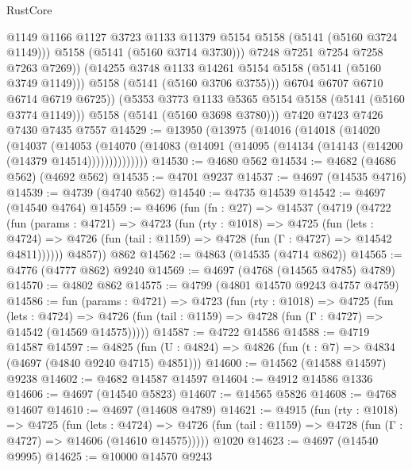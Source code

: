 \begin{lexlean}{RustCore}
\begin{coremodule}
                    @1149
                    @1166
                    @1127
                    @3723
                    @1133
                    @11379
                    @5154
                    @5158
                    (@5141 (@5160 @3724 @1149)))
                  @5158
                  (@5141 (@5160 @3714 @3730)))
                @7248
                @7251
                @7254
                @7258
                @7263
                @7269))
            (@14255 @3748 @1133 @14261 @5154 @5158 (@5141 (@5160 @3749 @1149)))
            @5158
            (@5141 (@5160 @3706 @3755)))
          @6704
          @6707
          @6710
          @6714
          @6719
          @6725))
      (@5353 @3773 @1133 @5365 @5154 @5158 (@5141 (@5160 @3774 @1149)))
      @5158
      (@5141 (@5160 @3698 @3780)))
    @7420
    @7423
    @7426
    @7430
    @7435
    @7557
@14529 := @13950
    (@13975
      (@14016
        (@14018
          (@14020
            (@14037
              (@14053
                (@14070 (@14083 (@14091 (@14095 (@14134 (@14143 (@14200 (@14379 @14514))))))))))))))
@14530 := @4680 @562
@14534 := @4682 (@4686 @562) (@4692 @562)
@14535 := @4701 @9237
@14537 := @4697 (@14535 @4716)
@14539 := @4739 (@4740 @562)
@14540 := @4735 @14539
@14542 := @4697 (@14540 @4764)
@14559 := @4696
    (fun (fn : @27) =>
    @14537
      (@4719
        (@4722
          (fun (params : @4721) =>
          @4723
            (fun (rty : @1018) =>
            @4725
              (fun (lets : @4724) =>
              @4726 (fun (tail : @1159) => @4728 (fun (Γ : @4727) => @14542 @4811))))))
        @4857))
    @862
@14562 := @4863 (@14535 (@4714 @862))
@14565 := @4776 (@4777 @862) @9240
@14569 := @4697 (@4768 (@14565 @4785) @4789)
@14570 := @4802 @862
@14575 := @4799 (@4801 @14570 @9243 @4757 @4759)
@14586 := fun (params : @4721) =>
  @4723
    (fun (rty : @1018) =>
    @4725
      (fun (lets : @4724) =>
      @4726 (fun (tail : @1159) => @4728 (fun (Γ : @4727) => @14542 (@14569 @14575)))))
@14587 := @4722 @14586
@14588 := @4719 @14587
@14597 := @4825 (fun (U : @4824) => @4826 (fun (t : @7) => @4834 (@4697 (@4840 @9240 @4715) @4851)))
@14600 := @14562 (@14588 @14597) @9238
@14602 := @4682 @14587 @14597
@14604 := @4912 @14586 @1336
@14606 := @4697 (@14540 @5823)
@14607 := @14565 @5826
@14608 := @4768 @14607
@14610 := @4697 (@14608 @4789)
@14621 := @4915
    (fun (rty : @1018) =>
    @4725
      (fun (lets : @4724) =>
      @4726 (fun (tail : @1159) => @4728 (fun (Γ : @4727) => @14606 (@14610 @14575)))))
    @1020
@14623 := @4697 (@14540 @9995)
@14625 := @10000 @14570 @9243

\end{coremodule}
\end{lexlean}

